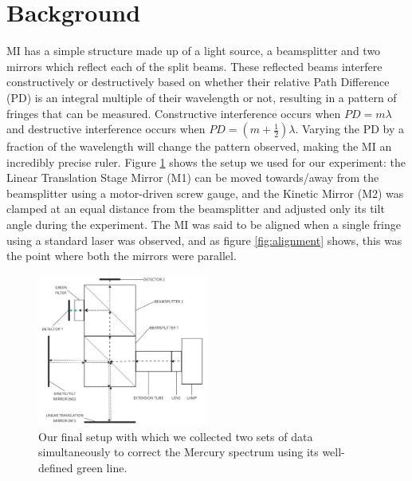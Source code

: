 \documentclass[journal]{Imperial_lab_report}
\begin{document}
\vspace{-5pt}

\section{Background}
 MI has a simple structure made up of a light source, a beamsplitter and two mirrors which reflect each of the split beams. These reflected beams interfere constructively or destructively based on whether their relative Path Difference (PD) is an integral multiple of their wavelength or not, resulting in a pattern of fringes that can be measured. Constructive interference occurs when $PD = m\lambda$ and destructive interference occurs when $PD = (m+\frac{1}{2})\lambda$. Varying the PD by a fraction of the wavelength will change the pattern observed, making the MI an incredibly precise ruler. Figure \ref{fig:setup} shows the setup we used for our experiment: the Linear Translation Stage Mirror (M1) can be moved towards/away from the beamsplitter using a motor-driven screw gauge, and the Kinetic Mirror (M2) was clamped at an equal distance from the beamsplitter and adjusted only its tilt angle during the experiment. The MI was said to be aligned when a single fringe using a standard laser was observed, and as figure \ref{fig:alignment} shows, this was the point where both the mirrors were parallel.

\begin{figure}[h]
\centering
\captionsetup{font=footnotesize}
    \includegraphics[width = 0.5\textwidth]{setup.jpg}
    \caption{Our final setup with which we collected two sets of data simultaneously to correct the Mercury spectrum using its well-defined green line.}
    \label{fig:setup}
\vspace{-15pt}
\end{figure}
\end{document}
